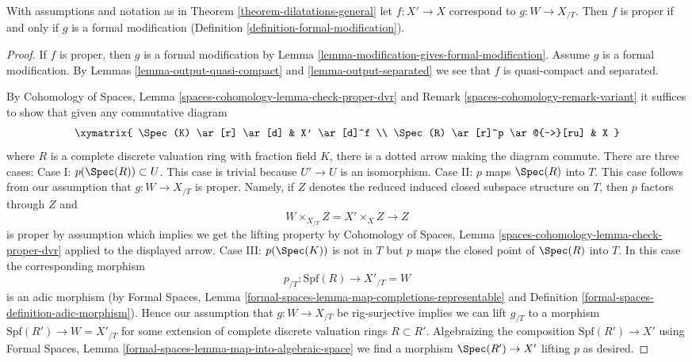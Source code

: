 \begin{lemma}
\label{lemma-output-proper}
With assumptions and notation as in Theorem \ref{theorem-dilatations-general}
let $f : X' \to X$ correspond to $g : W \to X_{/T}$.
Then $f$ is proper if and only if $g$ is a formal modification
(Definition \ref{definition-formal-modification}).
\end{lemma}

\begin{proof}
If $f$ is proper, then $g$ is a formal modification by
Lemma \ref{lemma-modification-gives-formal-modification}.
Assume $g$ is a formal modification. By
Lemmas \ref{lemma-output-quasi-compact} and \ref{lemma-output-separated}
we see that $f$ is quasi-compact and separated.

\medskip\noindent
By Cohomology of Spaces, Lemma \ref{spaces-cohomology-lemma-check-proper-dvr}
and Remark \ref{spaces-cohomology-remark-variant}
it suffices to show that given any commutative diagram
$$
\xymatrix{
\Spec(K) \ar[r] \ar[d] & X' \ar[d]^f \\
\Spec(R) \ar[r]^p \ar@{-->}[ru] & X
}
$$
where $R$ is a complete discrete valuation ring with fraction field $K$,
there is a dotted arrow making the diagram commute.
There are three cases:
Case I: $p(\Spec(R)) \subset U$. This case is trivial
because $U' \to U$ is an isomorphism.
Case II: $p$ maps $\Spec(R)$ into $T$. This case follows
from our assumption that $g : W \to X_{/T}$ is proper. Namely,
if $Z$ denotes the reduced induced closed subspace structure
on $T$, then $p$ factors through $Z$ and
$$
W \times_{X_{/T}} Z = X' \times_X Z \longrightarrow Z
$$
is proper by assumption which implies we get the lifting property by
Cohomology of Spaces, Lemma \ref{spaces-cohomology-lemma-check-proper-dvr}
applied to the displayed arrow. Case III: $p(\Spec(K))$ is not in $T$
but $p$ maps the closed point of $\Spec(R)$ into $T$. In this case
the corresponding morphism
$$
p_{/T} : \text{Spf}(R) \longrightarrow X'_{/T} = W
$$
is an adic morphism (by
Formal Spaces, Lemma
\ref{formal-spaces-lemma-map-completions-representable} and
Definition \ref{formal-spaces-definition-adic-morphism}).
Hence our assumption that $g : W \to X_{/T}$ be rig-surjective
implies we can lift $g_{/T}$ to a morphism
$\text{Spf}(R') \to W = X'_{/T}$
for some extension of complete discrete valuation rings $R \subset R'$.
Algebraizing the composition $\text{Spf}(R') \to X'$ using
Formal Spaces, Lemma \ref{formal-spaces-lemma-map-into-algebraic-space}
we find a morphism $\Spec(R') \to X'$ lifting $p$ as desired.
\end{proof}

